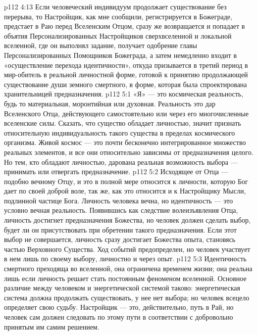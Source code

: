 \vs p112 4:13 Если человеческий индивидуум продолжает существование без перерыва, то Настройщик, как мне сообщили, регистрируется в Божеграде, предстает в Раю перед Вселенским Отцом, сразу же возвращается и попадает в объятия Персонализированных Настройщиков сверхвселенной и локальной вселенной, где он выполнял задание, получает одобрение главы Персонализированных Помощников Божеграда, а затем немедленно входит в «осуществление перехода идентичности», откуда призывается в третий период в мир\hyp{}обитель в реальной личностной форме, готовой к принятию продолжающей существование души земного смертного, в форме, которая была спроектирована хранительницей предназначения.
\vs p112 5:1 «Я» --- это космическая реальность, будь то материальная, моронтийная или духовная. Реальность  это дар Вселенского Отца, действующего самостоятельно или через его многочисленные вселенские силы. Сказать, что существо обладает личностью, значит признать относительную индивидуальность такого существа в пределах космического организма. Живой космос --- это почти бесконечно интегрированное множество реальных элементов, и все они относительно зависимы от предназначения целого. Но тем, кто обладают личностью, дарована реальная возможность выбора --- принимать или отвергать предназначение.
\vs p112 5:2 Исходящее от Отца --- подобно вечному Отцу, и это в полной мере относится к личности, которую Бог дает по своей доброй воле, так же, как это относится и к Настройщику Мысли, подлинной частице Бога. Личность человека вечна, но идентичность --- это условно вечная реальность. Появившись как следствие волеизъявления Отца, личность достигнет предназначения Божества, но человек должен сделать выбор, будет ли он присутствовать при обретении такого предназначения. Если этот выбор не совершается, личность сразу достигает Божества опыта, становясь частью Верховного Существа. Ход событий предопределен, но человек участвует в нем лишь по своему выбору, личностно и через опыт.
\vs p112 5:3 \pc Идентичность смертного преходяща во вселенной, она ограничена временем жизни; она реальна лишь если личность решает стать постоянным феноменом вселенной. Основное различие между человеком и энергетической системой таково: энергетическая система должна продолжать существовать, у нее нет выбора; но человек всецело определяет свою судьбу. Настройщик --- это, действительно, путь в Рай, но человек сам должен следовать по этому пути в соответствии с добровольно принятым им самим решением.
